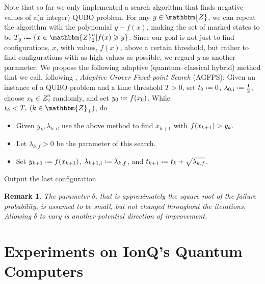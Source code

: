 \documentclass[reqno,10pt]{amsart}
\numberwithin{equation}{section}                %
\let\originalleft\left
\let\originalright\right
\renewcommand{\left}{\mathopen{}\mathclose\bgroup\originalleft}
\renewcommand{\right}{\aftergroup\egroup\originalright}
\def\({\mathopen{}\left(}
\def\){\right)\mathclose{}}
\newcommand*{\eqdef}{\mathrel{\vcenter{\baselineskip0.5ex \lineskiplimit0pt\hbox{.}\hbox{.}}}=}
\newtheorem{remark}[theorem]{Remark}
\def\Z{\mathbbm{Z}}
\begin{document}
\smallskip

Note that so far we only implemented a search algorithm that finds negative values of a(n integer) QUBO problem. For any $y \in \Z$, we can repeat the algorithm with the polynomial $y - f(x)$, making the set of marked states to be $T_y \eqdef \{ x \in \Z_2^n | f(x) \geqslant y \}$. Since our goal is not just to find configurations, $x$, with values, $f(x)$, above a certain threshold, but rather to find configurations with as high values as possible, we regard $y$ as another parameter. We propose the following adaptive (quantum--classical hybrid) method that we call, following \cite{gilliam_grover_2021}, \emph{Adaptive Grover Fixed-point Search} (AGFPS): Given an instance of a QUBO problem and a time threshold $T > 0$, set $t_0 \eqdef 0$, $\lambda_{0, \mathrm{i}} \eqdef \tfrac{1}{2}$, choose $x_0 \in Z_2^n$ randomly, and set $y_0 \eqdef f \( x_0 \)$. While $t_k < T, \: (k \in \Z_+)$, do
\begin{itemize}
   \item[] Given $y_k, \lambda_{k, \mathrm{i}}$, use the above method to find $x_{k + 1}$ with $f \( x_{k + 1} \) > y_k$.
   
   \item[] Let $\lambda_{k, f} > 0$ be the parameter of this search.
   
   \item[] Set $y_{k + 1} \eqdef f \( x_{k + 1} \)$, $\lambda_{k + 1, i} \eqdef \lambda_{k, f}$, and $t_{k + 1} \eqdef t_k + \sqrt{\lambda_{k, f}}$.
\end{itemize}
Output the last configuration.

\smallskip

\begin{remark}
   The parameter $\delta$, that is approximately the square root of the failure probability, is assumed to be small, but not changed throughout the iterations. Allowing $\delta$ to vary is another potential direction of improvement.
\end{remark}

\bigskip

\section{Experiments on IonQ's Quantum Computers}
\label{sec:experiments}
\end{document}
